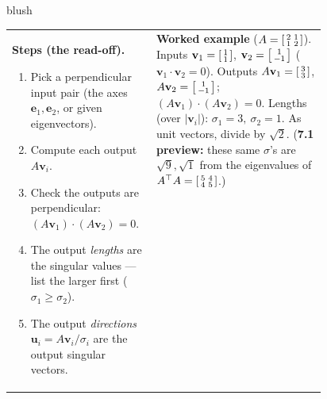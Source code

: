 \documentclass[10pt]{article}
\newcommand{\uu}{\mathbf{u}}
\newcommand{\vv}{\mathbf{v}}
\newcommand{\ee}{\mathbf{e}}
\newcommand{\T}{^{\top}}
\begin{document}
\begin{skillbox}{blush}
\begin{tabularx}{\linewidth}{@{}p{0.46\linewidth} X@{}}
\textbf{Steps (the read-off).}
\begin{enumerate}[leftmargin=1.3em, nosep, after=\vspace{2pt}]
  \item Pick a perpendicular input pair (the axes $\ee_1,\ee_2$, or given eigenvectors).
  \item Compute each output $A\vv_i$.
  \item Check the outputs are perpendicular: $(A\vv_1)\cdot(A\vv_2)=0$.
  \item The output \emph{lengths} are the singular values --- list the larger first ($\sigma_1\ge\sigma_2$).
  \item The output \emph{directions} $\uu_i=A\vv_i/\sigma_i$ are the output singular vectors.
\end{enumerate}
&
\textbf{Worked example} ($A=\begin{bsmallmatrix} 2 & 1\\ 1 & 2 \end{bsmallmatrix}$).
Inputs $\vv_1=\begin{bsmallmatrix} 1\\1 \end{bsmallmatrix}$, $\vv_2=\begin{bsmallmatrix} 1\\-1 \end{bsmallmatrix}$
($\vv_1\cdot\vv_2=0$). Outputs $A\vv_1=\begin{bsmallmatrix} 3\\3 \end{bsmallmatrix}$,
$A\vv_2=\begin{bsmallmatrix} 1\\-1 \end{bsmallmatrix}$; $(A\vv_1)\cdot(A\vv_2)=0$. Lengths (over $|\vv_i|$):
$\sigma_1=3,\ \sigma_2=1$. As unit vectors, divide by $\sqrt2$. (\textbf{7.1 preview:} these same
$\sigma$'s are $\sqrt{9},\sqrt{1}$ from the eigenvalues of $A\T A=\begin{bsmallmatrix} 5 & 4\\ 4 & 5 \end{bsmallmatrix}$.)
\end{tabularx}
\end{skillbox}
\end{document}
